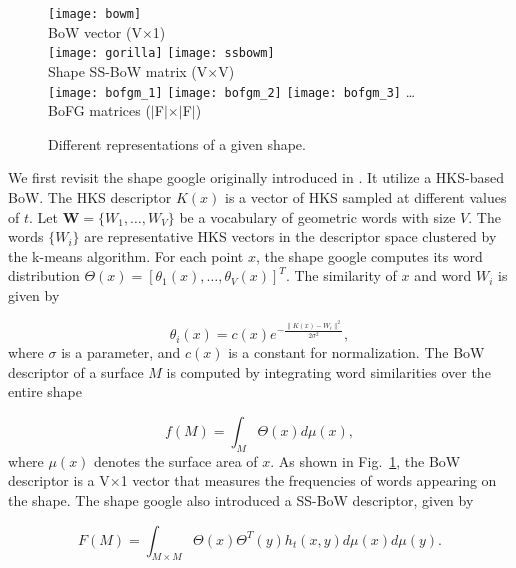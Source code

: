 \begin{figure}
\centering
\texttt{[image: bowm]}\\
BoW vector (V$\times$1)\\
\texttt{[image: gorilla]}
\hspace{20pt}
\texttt{[image: ssbowm]}\\
\hspace{30pt} Shape \hspace{46pt} SS-BoW matrix (V$\times$V)\\
\texttt{[image: bofgm\_1]}
\texttt{[image: bofgm\_2]}
\texttt{[image: bofgm\_3]}
\dots\\
BoFG matrices ($|$F$|$$\times$$|$F$|$)
\caption{Different representations of a given shape.}
\label{fig:represent}
\end{figure}

We first revisit the shape google originally introduced in \cite{Ovsjanikov:2009}. It utilize a HKS-based BoW. The HKS descriptor $K(x)$ is a vector of HKS sampled at different values of $t$. Let $\textbf{W}=\{W_1,\dots,W_V\}$ be a vocabulary of geometric words with size $V$. The words $\{W_i\}$ are representative HKS vectors in the descriptor space clustered by the k-means algorithm. For each point $x$, the shape google computes its word distribution $\Theta(x)=[\theta_1(x),\dots,\theta_V(x)]^T$. The similarity of $x$ and word $W_i$ is given by

\begin{equation}\label{eq:similar}
\theta_i(x)=c(x)e^{-\frac{\|K(x)-W_i\|^2}{2\sigma^2}},
\end{equation}
where $\sigma$ is a parameter, and $c(x)$ is a constant for normalization. The BoW descriptor of a surface $M$ is computed by integrating word similarities over the entire shape

\begin{equation}
f(M)=\int_M\Theta(x)d\mu(x),
\end{equation}
where $\mu(x)$ denotes the surface area of $x$. As shown in Fig.~\ref{fig:represent}, the BoW descriptor is a V$\times$1 vector that measures the frequencies of words appearing on the shape. The shape google also introduced a SS-BoW descriptor, given by

\begin{equation}
F(M)=\int_{M\times M}\Theta(x)\Theta^T(y)h_t(x,y)d\mu(x)d\mu(y).
\end{equation}

